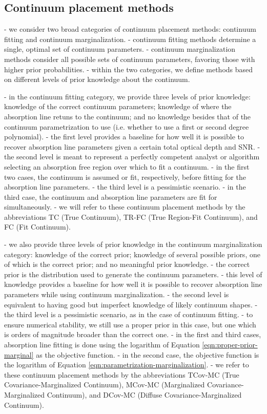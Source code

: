 \documentclass[trackchanges]{aastex62}
\begin{document}
{\color{red} \bf
\subsection{Continuum placement methods}
\label{sec:artificial-tests:continuum-placement-methods}
- we consider two broad categories of continuum placement methods: continuum fitting and continuum marginalization.
- continuum fitting methods determine a single, optimal set of continuum parameters.
- continuum marginalization methods consider all possible sets of continuum parameters, favoring those with higher prior probabilities.
- within the two categories, we define methods based on different levels of prior knowledge about the continuum.

- in the continuum fitting category, we provide three levels of prior knowledge: knowledge of the correct continuum parameters; knowledge of where the absorption line retuns to the continuum; and no knowledge besides that of the continuum parametrization to use (i.e. whether to use a first or second degree polynomial).
- the first level provides a baseline for how well it is possible to recover absorption line parameters given a certain total optical depth and SNR.
- the second level is meant to represent a perfectly competent analyst or algorithm selecting an absorption free region over which to fit a continuum.
- in the first two cases, the continuum is assumed or fit, respectively, before fitting for the absorption line parameters.
- the third level is a pessimistic scenario.
- in the third case, the continuum and absorption line parameters are fit for simultaneously.
- we will refer to these continuum placement methods by the abbreviations TC (True Continuum), TR-FC (True Region-Fit Continuum), and FC (Fit Continuum).

- we also provide three levels of prior knowledge in the continuum marginalization category: knowledge of the correct prior; knowledge of several possible priors, one of which is the correct prior; and no meaningful prior knowledge.
- the correct prior is the distribution used to generate the continuum parameters.
- this level of knowledge provides a baseline for how well it is possible to recover absorption line parameters while using continuum marginalization.
- the second level is equivalent to having good but imperfect knowledge of likely continuum shapes.
- the third level is a pessimistic scenario, as in the case of continuum fitting.
- to ensure numerical stability, we still use a proper prior in this case, but one which is orders of magnitude broader than the correct one.
- in the first and third cases, absorption line fitting is done using the logarithm of Equation \ref{eqn:proper-prior-marginal} as the objective function.
- in the second case, the objective function is the logarithm of Equation \ref{eqn:parametrization-marginalization}.
- we refer to these continuum placement methods by the abbreviations TCov-MC (True Covariance-Marginalized Continuum), MCov-MC (Marginalized Covariance-Marginalized Continuum), and DCov-MC (Diffuse Covariance-Marginalized Continuum).
}
\end{document}
